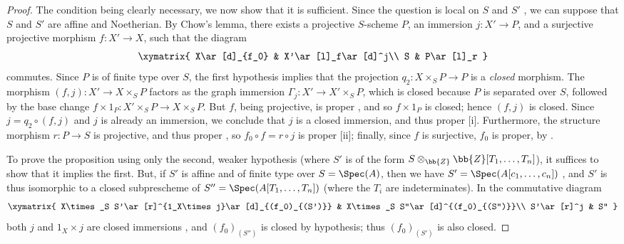 \begin{proof}
The condition being clearly necessary, we now show that it is sufficient.
Since the question is local on $S$ and $S'$ , we can suppose that $S$ and $S'$ are affine and Noetherian.
By Chow's lemma, there exists a projective $S$-scheme $P$, an immersion $j:X'\to P$, and a surjective projective morphism $f:X'\to X$, such that the diagram
\[
  \xymatrix{
    X\ar[d]_{f_0} &
    X'\ar[l]_f\ar[d]^j\\
    S &
    P\ar[l]_r
  }
\]
commutes.
Since $P$ is of finite type over $S$, the first hypothesis implies that the projection $q_2:X\times_S P\to P$ is a \emph{closed} morphism.
The morphism $(f,j):X'\to X\times_S P$ factors as the graph immersion $\Gamma_j:X'\to X'\times_S P$, which is closed because $P$ is separated over $S$, followed by the base change $f\times1_P:X'\times_S P\to X\times_S P$.
But $f$, being projective, is proper , and so $f\times1_P$ is closed; hence $(f,j)$ is closed.
Since $j=q_2\circ(f,j)$ and $j$ is already an immersion, we conclude that $j$ is a closed immersion, and thus proper [i].
Furthermore, the structure morphism $r:P\to S$ is projective, and thus proper , so $f_0\circ f=r\circ j$ is proper [ii];
finally, since $f$ is surjective, $f_0$ is proper, by .

To prove the proposition using only the second, weaker hypothesis (where $S'$ is of the form $S\otimes_\bb{Z}\bb{Z}[T_1,\ldots,T_n]$), it suffices to show that it implies the first.
But, if $S'$ is affine and of finite type over $S=\Spec(A)$,
then we have $S'=\Spec(A[c_1,\ldots,c_n])$ , and $S'$ is thus isomorphic to a closed subprescheme of $S''=\Spec(A[T_1,\ldots,T_n])$ (where the $T_i$ are indeterminates).
In the commutative diagram
\[
  \xymatrix{
    X\times_S S'\ar[r]^{1_X\times j}\ar[d]_{(f_0)_{(S')}} &
    X\times_S S''\ar[d]^{(f_0)_{(S'')}}\\
    S'\ar[r]^j &
    S''
  }
\]
both $j$ and $1_X\times j$ are closed immersions , and $(f_0)_{(S'')}$ is closed by hypothesis; thus $(f_0)_{(S')}$ is also closed.
\end{proof}
